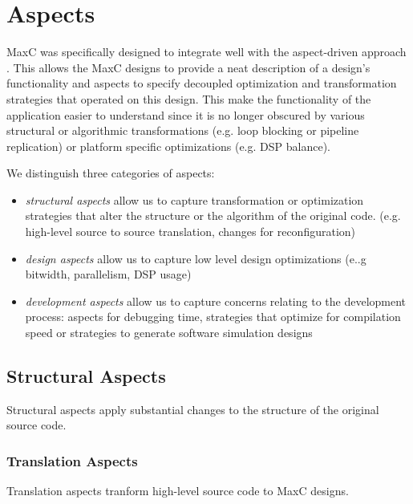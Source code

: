 \section{Aspects}

MaxC was specifically designed to integrate well with the
aspect-driven approach . This allows the MaxC designs to
provide a neat description of a design's functionality and aspects to
specify decoupled optimization and transformation strategies that
operated on this design. This make the functionality of the
application easier to understand since it is no longer obscured by
various structural or algorithmic transformations (e.g. loop blocking
or pipeline replication) or platform specific optimizations (e.g. DSP
balance).

We distinguish three categories of aspects:
\begin{itemize}
\item \emph{structural aspects} allow us to capture transformation or
  optimization strategies that alter the structure or the algorithm of
  the original code. (e.g. high-level source to source translation,
  changes for reconfiguration)

\item \emph{design aspects} allow us to capture low level design
  optimizations (e..g bitwidth, parallelism, DSP usage)

\item \emph{development aspects} allow us to capture concerns relating
  to the development process: aspects for debugging time, strategies
  that optimize for compilation speed or strategies to generate
  software simulation designs

\end{itemize}

\subsection{Structural Aspects}

Structural aspects apply substantial changes to the structure of the
original source code. 

\subsubsection{Translation Aspects}

Translation aspects tranform high-level source code to MaxC designs.

